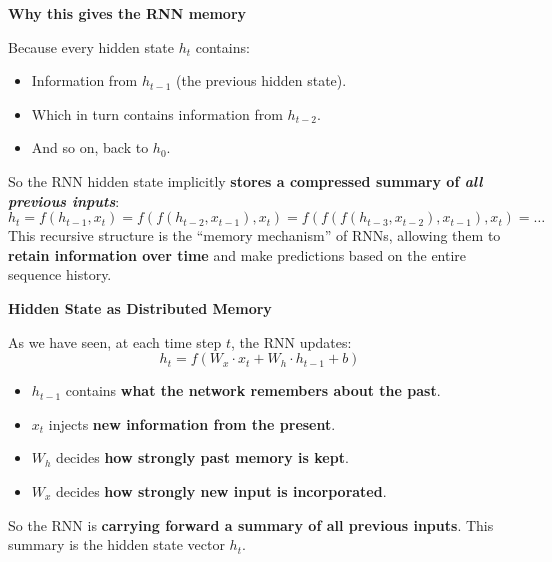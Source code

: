 \highspace
\begin{flushleft}
    \textcolor{Green3}{ \textbf{Why this gives the RNN memory}}
\end{flushleft}
Because every hidden state $h_t$ contains:
\begin{itemize}
    \item Information from $h_{t-1}$ (the previous hidden state).
    \item Which in turn contains information from $h_{t-2}$.
    \item And so on, back to $h_0$.
\end{itemize}
So the RNN hidden state implicitly \textbf{stores a compressed summary of \emph{all previous inputs}}:
\begin{equation*}
    h_t = f\left(h_{t-1}, x_{t}\right) = f\left(
        f\left(h_{t-2}, x_{t-1}\right), x_{t}
    \right) = 
    f\left(
        f\left(
            f\left(h_{t-3}, x_{t-2}\right), x_{t-1}
        \right), x_{t}
    \right) = \ldots
\end{equation*}
This recursive structure is the ``memory mechanism'' of RNNs, allowing them to \textbf{retain information over time} and make predictions based on the entire sequence history.

\highspace
\begin{flushleft}
    \textcolor{Green3}{ \textbf{Hidden State as Distributed Memory}}
\end{flushleft}
As we have seen, at each time step $t$, the RNN updates:
\begin{equation*}
    h_t = f\left(W_x \cdot x_t + W_h \cdot h_{t-1} + b\right)
\end{equation*}
\begin{itemize}
    \item $h_{t-1}$ contains \textbf{what the network remembers about the past}.
    \item $x_t$ injects \textbf{new information from the present}.
    \item $W_h$ decides \textbf{how strongly past memory is kept}.
    \item $W_x$ decides \textbf{how strongly new input is incorporated}.
\end{itemize}
So the RNN is \textbf{carrying forward a summary of all previous inputs}. This summary is the hidden state vector $h_t$.

